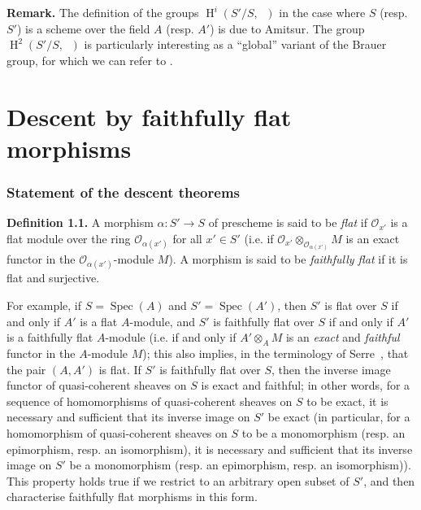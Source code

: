\documentclass{article}
\newenvironment{rmenv}[1]
  {\phantomsection\par\medskip\noindent\textbf{#1.}\rmfamily}
  {\par\medskip}
\newcommand{\scr}[1]{{\mathscr{#1}}}
\DeclareMathOperator{\HH}{H}
\DeclareMathOperator{\Gm}{G_m}
\DeclareMathOperator{\Spec}{Spec}
\newcommand{\oldpage}[1]{\marginpar{\footnotesize$\Big\vert$ \textit{p.~#1}}}
\begin{document}
\begin{rmenv}{Remark}
  The definition of the groups $\HH^i(S'/S,\Gm)$ in the case where $S$ (resp. $S'$) is a scheme over the field $A$ (resp. $A'$) is due to Amitsur.
  The group $\HH^2(S'/S,\Gm)$ is particularly interesting as a ``global'' variant of the Brauer group, for which we can refer to \cite[chap.~VII]{1}.
\end{rmenv}



\part{Descent by faithfully flat morphisms}
\label{B}

\section{Statement of the descent theorems}
\label{B.1}

\begin{rmenv}{Definition 1.1}
  A morphism $\alpha\colon S'\to S$ of prescheme is said to be \emph{flat} if $\scr{O}_{x'}$ is a flat module over the ring $\scr{O}_{\alpha(x')}$ for all $x'\in S'$ (i.e. if $\scr{O}_{x'}\otimes_{\scr{O}_{\alpha(x')}}M$ is an exact functor in the $\scr{O}_{\alpha(x')}$-module $M$).
  A morphism is said to be \emph{faithfully flat} if it is flat and surjective.
\end{rmenv}

For example, if $S=\Spec(A)$ and $S'=\Spec(A')$, then $S'$ is flat over $S$ if and only if $A'$ is a flat $A$-module, and $S'$ is faithfully flat over $S$ if and only if $A'$ is a faithfully flat $A$-module (i.e. if and only if $A'\otimes_A M$ is an \emph{exact} and \emph{faithful} functor in the $A$-module $M$);
this also implies, in the terminology of Serre~\cite{5}, that the pair $(A,A')$ is flat.
If $S'$ is faithfully flat over $S$, then the inverse image functor of quasi-coherent sheaves on $S$ is exact and faithful;
in other words, for a sequence of homomorphisms of
\oldpage{190-17}
quasi-coherent sheaves on $S$ to be exact, it is necessary and sufficient that its inverse image on $S'$ be exact (in particular, for a homomorphism of quasi-coherent sheaves on $S$ to be a monomorphism (resp. an epimorphism, resp. an isomorphism), it is necessary and sufficient that its inverse image on $S'$ be a monomorphism (resp. an epimorphism, resp. an isomorphism)).
This property holds true if we restrict to an arbitrary open subset of $S'$, and then characterise faithfully flat morphisms in this form.
\end{document}
